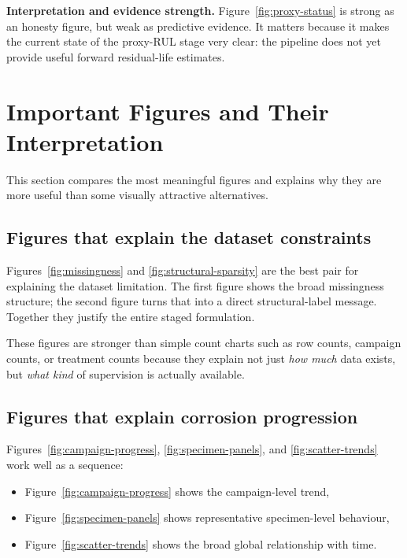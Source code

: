 \documentclass[10pt,a4paper,twocolumn]{article}
\begin{document}
\textbf{Interpretation and evidence strength.} Figure~\ref{fig:proxy-status} is strong as an honesty figure, but weak as predictive evidence. It matters because it makes the current state of the proxy-RUL stage very clear: the pipeline does not yet provide useful forward residual-life estimates.

\section{Important Figures and Their Interpretation}
\label{sec:important-figures}

This section compares the most meaningful figures and explains why they are more useful than some visually attractive alternatives.

\subsection{Figures that explain the dataset constraints}

Figures~\ref{fig:missingness} and \ref{fig:structural-sparsity} are the best pair for explaining the dataset limitation. The first figure shows the broad missingness structure; the second figure turns that into a direct structural-label message. Together they justify the entire staged formulation.

These figures are stronger than simple count charts such as row counts, campaign counts, or treatment counts because they explain not just \emph{how much} data exists, but \emph{what kind} of supervision is actually available.

\subsection{Figures that explain corrosion progression}

Figures~\ref{fig:campaign-progress}, \ref{fig:specimen-panels}, and \ref{fig:scatter-trends} work well as a sequence:

\begin{itemize}
    \item Figure~\ref{fig:campaign-progress} shows the campaign-level trend,
    \item Figure~\ref{fig:specimen-panels} shows representative specimen-level behaviour,
    \item Figure~\ref{fig:scatter-trends} shows the broad global relationship with time.
\end{itemize}
\end{document}
